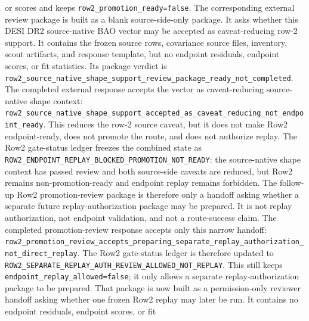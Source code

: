\documentclass[11pt]{article}
\begin{document}
or scores and keeps \texttt{row2\_\allowbreak{}promotion\_\allowbreak{}ready=\allowbreak{}false}.
The corresponding external review package is built as a blank source-side-only
package.  It asks whether this DESI DR2 source-native BAO vector may be accepted
as caveat-reducing row-2 support.  It contains the frozen source rows,
covariance source files, inventory, scout artifacts, and response template, but
no endpoint residuals, endpoint scores, or fit statistics.  Its package verdict
is
\texttt{row2\_\allowbreak{}source\_\allowbreak{}native\_\allowbreak{}shape\_\allowbreak{}support\_\allowbreak{}review\_\allowbreak{}package\_\allowbreak{}ready\_\allowbreak{}not\_\allowbreak{}completed}.
The completed external response accepts the vector as caveat-reducing
source-native shape context:
\texttt{row2\_\allowbreak{}source\_\allowbreak{}native\_\allowbreak{}shape\_\allowbreak{}support\_\allowbreak{}accepted\_\allowbreak{}as\_\allowbreak{}caveat\_\allowbreak{}reducing\_\allowbreak{}not\_\allowbreak{}endpoint\_\allowbreak{}ready}.
This reduces the row-2 source caveat, but it does not make Row2 endpoint-ready,
does not promote the route, and does not authorize replay.
The Row2 gate-status ledger freezes the combined state as
\texttt{ROW2\_\allowbreak{}ENDPOINT\_\allowbreak{}REPLAY\_\allowbreak{}BLOCKED\_\allowbreak{}PROMOTION\_\allowbreak{}NOT\_\allowbreak{}READY}:
the source-native shape context has passed review and both source-side caveats
are reduced, but Row2 remains non-promotion-ready and endpoint replay remains
forbidden.
The follow-up Row2 promotion-review package is therefore only a handoff asking
whether a separate future replay-authorization package may be prepared.  It is
not replay authorization, not endpoint validation, and not a route-success
claim.
The completed promotion-review response accepts only this narrow handoff:
\texttt{row2\_\allowbreak{}promotion\_\allowbreak{}review\_\allowbreak{}accepts\_\allowbreak{}preparing\_\allowbreak{}separate\_\allowbreak{}replay\_\allowbreak{}authorization\_\allowbreak{}not\_\allowbreak{}direct\_\allowbreak{}replay}.
The Row2 gate-status ledger is therefore updated to
\texttt{ROW2\_\allowbreak{}SEPARATE\_\allowbreak{}REPLAY\_\allowbreak{}AUTH\_\allowbreak{}REVIEW\_\allowbreak{}ALLOWED\_\allowbreak{}NOT\_\allowbreak{}REPLAY}.
This still keeps \texttt{endpoint\_\allowbreak{}replay\_\allowbreak{}allowed=\allowbreak{}false}; it only allows a
separate replay-authorization package to be prepared.  That package is now built
as a permission-only reviewer handoff asking whether one frozen Row2 replay may
later be run.  It contains no endpoint residuals, endpoint scores, or fit
\end{document}
